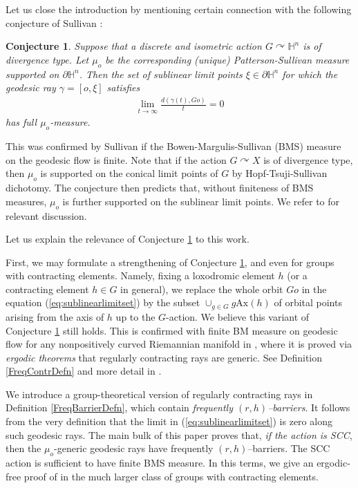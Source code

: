 \documentclass{amsart}
\newtheorem{conj}[thm]{Conjecture}
\theoremstyle{definition}
\theoremstyle{remark}
\newcommand{\act}{\curvearrowright}
\newcommand{\U}{ X}
\newcommand{\ax}{\mathrm{Ax}}
\begin{document}
Let us close the introduction by mentioning certain connection with the following conjecture of Sullivan \cite{Sul}:
\begin{conj}\label{Sullivan}
Suppose that a discrete and isometric action $G\act \mathbb H^n$ is of divergence type. Let $\mu_o$ be the corresponding (unique) Patterson-Sullivan measure supported on $\partial \mathbb H^n$. Then the set of \emph{sublinear limit points} $\xi\in \partial \mathbb H^n$ for which the geodesic ray $\gamma=[o,\xi]$ satisfies 
\begin{align}\label{eq:sublinearlimitset}
\lim_{t\to\infty} \frac{d(\gamma(t), Go) }{t} = 0    
\end{align}
has full $\mu_o$-measure.
\end{conj}
This was confirmed by Sullivan \cite[Corollary 19]{Sul} if the Bowen-Margulis-Sullivan (BMS) measure on the geodesic flow is finite. Note that if the action $G\act\U$ is of divergence type, then $\mu_o$ is supported on the conical limit points of $G$ by Hopf-Tsuji-Sullivan dichotomy.
The conjecture then predicts that, without finiteness of BMS measures,  $\mu_o$ is further supported on the {sublinear limit points}. We refer to \cite{FM20} for relevant discussion. 

Let us explain the relevance  of Conjecture \ref{Sullivan} to this work. 

First, we may  formulate a strengthening  of Conjecture \ref{Sullivan}, and even for groups with contracting elements. Namely, fixing a loxodromic element  $h$ (or  a contracting element  $h\in G$ in general), we replace the whole orbit $Go$  in the equation (\ref{eq:sublinearlimitset}) by the subset $\cup_{g\in G} g\ax(h)$ of orbital points arising from the axis of $h$ up to the $G$-action. We believe this variant of Conjecture \ref{Sullivan} still holds. This is confirmed with finite BM measure on geodesic flow for any nonpositively curved Riemannian manifold in \cite[Thm 5.1]{GQR22}, where it is proved via \textit{ergodic theorems} that regularly contracting rays  are generic. See Definition \ref{FreqContrDefn} and more detail in \cite{GQR22}.

We introduce a group-theoretical version of regularly contracting rays in Definition \ref{FreqBarrierDefn}, which contain \textit{frequently $(r, h)$--barriers}. It follows from the very definition that   the limit in (\ref{eq:sublinearlimitset}) is  zero along such geodesic rays. 
The main bulk of this paper proves that, \textit{if the action is SCC}, then the $\mu_o$-generic geodesic rays have {frequently} $(r, h)$--barriers. The SCC action is sufficient to have finite BMS measure. In this terms,  we  give an ergodic-free proof of \cite[Theorems 5.1, 7.1]{GQR22} in the much larger class of groups with contracting elements. 
 
\end{document}
